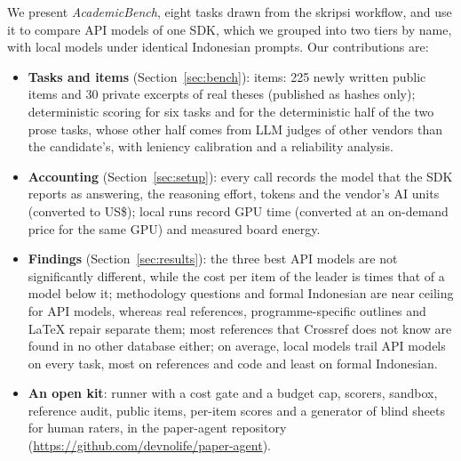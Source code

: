 We present \emph{AcademicBench}, eight tasks drawn from the skripsi workflow, and use it to compare \NApi{} API models of one SDK, which we grouped into two tiers by name, with \NLocal{} local models under identical Indonesian prompts. Our contributions are:
\begin{itemize}
  \item \textbf{Tasks and items} (Section~\ref{sec:bench}): \NItems{} items: 225 newly written public items and 30 private excerpts of real theses (published as hashes only); deterministic scoring for six tasks and for the deterministic half of the two prose tasks, whose other half comes from LLM judges of other vendors than the candidate's, with leniency calibration and a reliability analysis.
  \item \textbf{Accounting} (Section~\ref{sec:setup}): every call records the model that the SDK reports as answering, the reasoning effort, tokens and the vendor's AI units (converted to US\$); local runs record GPU time (converted at an on-demand price for the same GPU) and measured board energy.
  \item \textbf{Findings} (Section~\ref{sec:results}): the three best API models are not significantly different, while the cost per item of the leader is \CostRatio{} times that of a model \CheapGap{} below it; methodology questions and formal Indonesian are near ceiling for API models, whereas real references, programme-specific outlines and LaTeX repair separate them; most references that Crossref does not know are found in no other database either; on average, local models trail API models on every task, most on references and code and least on formal Indonesian.
  \item \textbf{An open kit}: runner with a cost gate and a budget cap, scorers, sandbox, reference audit, public items, per-item scores and a generator of blind sheets for human raters, in the paper-agent repository (\url{https://github.com/devnolife/paper-agent}).
\end{itemize}
